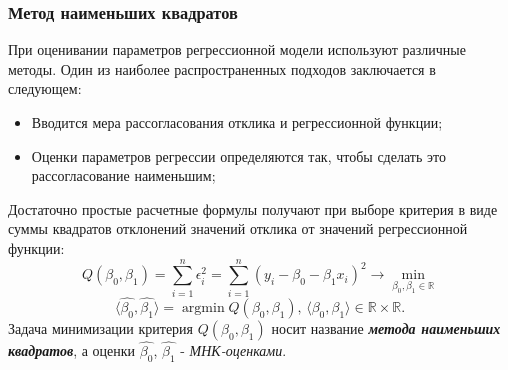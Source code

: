 \documentclass[14pt]{extarticle}
\DeclareMathOperator{\argmin}{argmin} %
\begin{document}
\subsubsection{Метод наименьших квадратов}
При оценивании параметров регрессионной модели используют различные методы. Один из наиболее распространенных подходов заключается в следующем:
\begin{itemize}
    \item Вводится мера рассогласования отклика и регрессионной функции;
    \item Оценки параметров регрессии определяются так, чтобы сделать это рассогласование наименьшим;
\end{itemize}
Достаточно простые расчетные формулы получают при выборе критерия в виде суммы квадратов отклонений значений отклика от значений регрессионной функции: \[Q(\beta_0, \beta_1)=\sum\limits_{i=1}^n\epsilon_i^2=\sum\limits_{i=1}^n(y_i-\beta_0-\beta_1x_i)^2\to\min\limits_{\beta_0,\beta_1\in\mathbb{R}}^{}\]\[\langle\widehat{\beta_0},\widehat{\beta_1}\rangle=\argmin Q(\beta_0, \beta_1)\text{, }\langle\beta_0,\beta_1\rangle\in\mathbb{R}\times\mathbb{R}.\] Задача минимизации критерия \(Q(\beta_0, \beta_1)\) носит название \textbf{\textit{метода наименьших квадратов}}, а оценки \(\widehat{\beta_0}\), \(\widehat{\beta_1}\) - \textit{МНК-оценками}.
\end{document}
